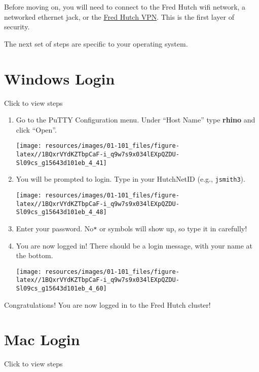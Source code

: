 \documentclass[
]{book}
\begin{document}
Before moving on, you will need to connect to the Fred Hutch wifi network, a networked ethernet jack, or the \href{https://centernet.fredhutch.org/cn/u/center-it/help-desk/vpn.html}{Fred Hutch VPN}. This is the first layer of security.

The next set of steps are specific to your operating system.

\hypertarget{windows-login}{%
\section{Windows Login}\label{windows-login}}

Click to view steps

\begin{enumerate}
\def\labelenumi{\arabic{enumi}.}
\item
  Go to the PuTTY Configuration menu. Under ``Host Name'' type \textbf{rhino} and click ``Open''.

  \texttt{[image: resources/images/01-101\_files/figure-latex//1BQxrVYdKZTbpCaF-i\_q9w7s9x034lEXpQZDU-Sl09cs\_g15643d101eb\_4\_41]}
\item
  You will be prompted to login. Type in your HutchNetID (e.g., \texttt{jsmith3}).

  \texttt{[image: resources/images/01-101\_files/figure-latex//1BQxrVYdKZTbpCaF-i\_q9w7s9x034lEXpQZDU-Sl09cs\_g15643d101eb\_4\_48]}
\item
  Enter your password. No\texttt{*} or symbols will show up, so type it in carefully!
\item
  You are now logged in! There should be a login message, with your name at the bottom.

  \texttt{[image: resources/images/01-101\_files/figure-latex//1BQxrVYdKZTbpCaF-i\_q9w7s9x034lEXpQZDU-Sl09cs\_g15643d101eb\_4\_60]}
\end{enumerate}

Congratulations! You are now logged in to the Fred Hutch cluster!

\hypertarget{mac-login}{%
\section{Mac Login}\label{mac-login}}

Click to view steps
\end{document}
